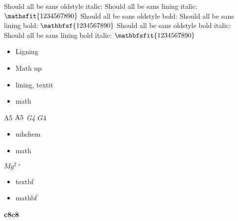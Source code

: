 {  Should all be sans oldstyle italic:\newline
  \textsf{\textit{\y}}\newline
  Should all be sans lining italic:\newline
  \textsf{\lining\textit{\y}}\newline
  $\mathsfit{\y}$\newline
  Should all be sans oldstyle bold:\newline
  \textbf{\textsf{\y}}\newline
  Should all be sans lining bold:\newline
  \textbf{\textsf{\lining\y}} \newline
  $\mathbfsf{\y}$\newline
  Should all be sans oldstyle bold italic:\newline
  \textbf{\textsf{\textit{\y}}}\newline
  Should all be sans lining bold italic:\newline
  \textbf{\textsf{\lining\textit{\y}}} \newline
  $\mathbfsfit{\y}$\newline
}

\tightlists
\begin{itemize}
\item Ligning
\item Math up
\item lining, textit
\item math
\end{itemize}

{\lining A5} $\textup{A5}$ {\lining \textit{G4}} $G4$

\begin{itemize}
\item mhchem
\item math
\end{itemize}

$Mg^{2+}$

\begin{itemize}
\item textbf
\item mathbf
\end{itemize}

\textbf{c8}$\mathbf{c8}$


